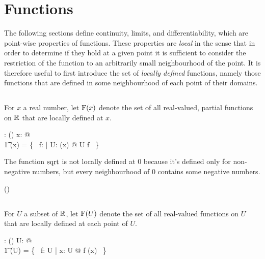 \documentclass[11pt, oneside]{article}
\begin{document}
\section{Functions}

The following sections define continuity, limits, and differentiability, which are point-wise properties of functions.
These properties are {\it local} in the sense that in order to determine if they hold at a given point it is sufficient to
consider the restriction of the function to an arbitrarily small neighbourhood of the point.
It is therefore useful to first introduce the set of {\it locally defined} functions, 
namely those functions that are defined in some neighbourhood of each point of  their domains.

\subsection{}

For $x$ a real number,
let $\operatorname{F}(x)$ denote the set of all real-valued, partial functions on $\mathbb{R}$ that are locally defined at $x$.

\begin{axdef}
	\FunR: \R \fun \power(\R \pfun \R)
\where
	\forall x: \R @ \\
	\t1	\FunR(x) = \{~ f: \R \pfun \R | \exists U: \neighR(x) @ U \subseteq \dom f ~\}
\end{axdef}

\begin{remark}
The function $\operatorname{sqrt}$ is not locally defined at $0$ because it's defined only for non-negative numbers,
but every neighbourhood of $0$ contains some negative numbers.

\begin{zed}
	\sqrtR \notin \FunR(\zeroR)
\end{zed}

\end{remark}

\subsection{}

For $U$ a subset of $\mathbb{R}$,
let $\operatorname{F}(U)$ denote the set of all real-valued functions on $U$ that are locally defined at each point of $U$.

\begin{axdef}
	\FunPR: \power \R \fun \power (\R \pfun \R)
\where
	\forall U: \power \R @ \\
	\t1	\FunPR(U) = \{~ f: U \fun \R | \forall x: U @ f \in \FunR(x) ~\}
\end{axdef}
\end{document}
